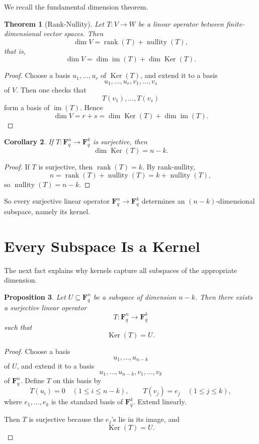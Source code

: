 \documentclass[11pt]{article}
\newtheorem{theorem}{Theorem}[section]
\newtheorem{proposition}[theorem]{Proposition}
\newtheorem{corollary}[theorem]{Corollary}
\theoremstyle{definition}
\theoremstyle{remark}
\newcommand{\F}{\mathbf{F}}
\newcommand{\rank}{\operatorname{rank}}
\newcommand{\nullity}{\operatorname{nullity}}
\newcommand{\im}{\operatorname{im}}
\newcommand{\Ker}{\operatorname{Ker}}
\begin{document}
	We recall the fundamental dimension theorem.
	
	\begin{theorem}[Rank-Nullity]
		Let \(T:V\to W\) be a linear operator between finite-dimensional vector spaces. Then
		\[
		\dim V=\rank(T)+\nullity(T),
		\]
		that is,
		\[
		\dim V=\dim\im(T)+\dim\Ker(T).
		\]
	\end{theorem}
	
	\begin{proof}
		Choose a basis \(u_1,\dots,u_r\) of \(\Ker(T)\), and extend it to a basis
		\[
		u_1,\dots,u_r,v_1,\dots,v_s
		\]
		of \(V\). Then one checks that
		\[
		T(v_1),\dots,T(v_s)
		\]
		form a basis of \(\im(T)\). Hence
		\[
		\dim V=r+s=\dim\Ker(T)+\dim\im(T).
		\]
	\end{proof}
	
	\begin{corollary}
		If \(T:\F_q^n\to \F_q^k\) is surjective, then
		\[
		\dim\Ker(T)=n-k.
		\]
	\end{corollary}
	
	\begin{proof}
		If \(T\) is surjective, then \(\rank(T)=k\). By rank-nullity,
		\[
		n=\rank(T)+\nullity(T)=k+\nullity(T),
		\]
		so \(\nullity(T)=n-k\).
	\end{proof}
	
	So every surjective linear operator \(\F_q^n\to \F_q^k\) determines an \((n-k)\)-dimensional subspace, namely its kernel.
	
	\section{Every Subspace Is a Kernel}
	
	The next fact explains why kernels capture all subspaces of the appropriate dimension.
	
	\begin{proposition}
		Let \(U\subseteq \F_q^n\) be a subspace of dimension \(n-k\). Then there exists a surjective linear operator
		\[
		T:\F_q^n\to \F_q^k
		\]
		such that
		\[
		\Ker(T)=U.
		\]
	\end{proposition}
	
	\begin{proof}
		Choose a basis
		\[
		u_1,\dots,u_{n-k}
		\]
		of \(U\), and extend it to a basis
		\[
		u_1,\dots,u_{n-k},v_1,\dots,v_k
		\]
		of \(\F_q^n\). Define \(T\) on this basis by
		\[
		T(u_i)=0 \quad (1\le i\le n-k), \qquad T(v_j)=e_j \quad (1\le j\le k),
		\]
		where \(e_1,\dots,e_k\) is the standard basis of \(\F_q^k\). Extend linearly.
		
		Then \(T\) is surjective because the \(e_j\)'s lie in its image, and
		\[
		\Ker(T)=U.
		\]
	\end{proof}
	
\end{document}

